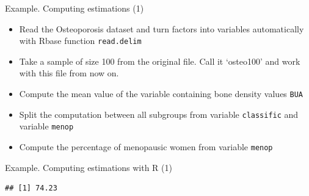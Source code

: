 \documentclass[
  ignorenonframetext,
]{beamer}
\newenvironment{Shaded}{\begin{snugshade}}{\end{snugshade}}
\newcommand{\AttributeTok}[1]{\textcolor[rgb]{0.77,0.63,0.00}{#1}}
\newcommand{\CommentTok}[1]{\textcolor[rgb]{0.56,0.35,0.01}{\textit{#1}}}
\newcommand{\ConstantTok}[1]{\textcolor[rgb]{0.00,0.00,0.00}{#1}}
\newcommand{\DecValTok}[1]{\textcolor[rgb]{0.00,0.00,0.81}{#1}}
\newcommand{\FunctionTok}[1]{\textcolor[rgb]{0.00,0.00,0.00}{#1}}
\newcommand{\NormalTok}[1]{#1}
\newcommand{\OtherTok}[1]{\textcolor[rgb]{0.56,0.35,0.01}{#1}}
\newcommand{\SpecialCharTok}[1]{\textcolor[rgb]{0.00,0.00,0.00}{#1}}
\newcommand{\StringTok}[1]{\textcolor[rgb]{0.31,0.60,0.02}{#1}}
\providecommand{\tightlist}{%
  \setlength{\itemsep}{0pt}\setlength{\parskip}{0pt}}
\begin{document}
\begin{frame}[fragile]{Example. Computing estimations (1)}
\protect\hypertarget{example.-computing-estimations-1}{}
\begin{itemize}
\tightlist
\item
  Read the Osteoporosis dataset and turn factors into variables
  automatically with Rbase function \texttt{read.delim}
\item
  Take a sample of size 100 from the original file. Call it `osteo100'
  and work with this file from now on.
\item
  Compute the mean value of the variable containing bone density values
  \texttt{BUA}
\item
  Split the computation between all subgroups from variable
  \texttt{classific} and variable \texttt{menop}
\item
  Compute the percentage of menopausic women from variable
  \texttt{menop}
\end{itemize}
\end{frame}

\begin{frame}[fragile]{Example. Computing estimations with R (1)}
\protect\hypertarget{example.-computing-estimations-with-r-1}{}
\small

\begin{Shaded}
\end{Shaded}

\begin{verbatim}
## [1] 74.23
\end{verbatim}
\end{frame}
\end{document}
